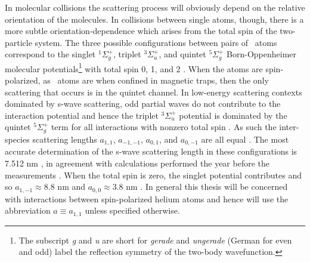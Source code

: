 	In molecular collisions the scattering process will obviously depend on the relative orientation of the molecules.
	In collisions between single atoms, though, there is a more subtle orientation-dependence which arises from the total spin of the two-particle system.
	The three possible configurations between pairs of \mhe~atoms correspond to the singlet $^1\Sigma_g^+$, triplet $^3\Sigma_u^+$, and quintet $^5\Sigma_g^+$ Born-Oppenheimer molecular potentials\footnote{The subscript \emph{g} and \emph{u} are short for \emph{gerade} and \emph{ungerade} (German for even and odd) label the reflection symmetry of the two-body wavefunction.} with total spin 0, 1, and 2 .
	When the atoms are spin-polarized, as \mhe~atoms are when confined in magnetic traps, then the only scattering that occurs is in the quintet channel.
	In low-energy scattering contexts dominated by s-wave scattering, odd partial waves do not contribute to the interaction potential and hence the triplet $^3\Sigma_u^+$ potential is dominated by the quintet $^5\Sigma_g^+$ term for all interactions with nonzero total spin \cite{Leo01}. 
	As such the inter-species scattering lengths $a_{1,1}$, $a_{-1,-1}$, $a_{0,1}$, and $a_{0,-1}$ are all equal \cite{Leo01,Vassen16}.
	The most accurate determination of the s-wave scattering length in these configurations is 7.512 nm \cite{Moal06}, in agreement with calculations performed the year before the measurements \cite{Przybytek05}.
	When the total spin is zero, the singlet potential contributes and so $a_{1,-1}\approx8.8$ nm and $a_{0,0}\approx3.8$ nm \cite{Leo01,Vassen16}.
	In general this thesis will be concerned with interactions between spin-polarized helium atoms and hence will use the abbreviation $a\equiv a_{1,1}$ unless specified otherwise.
	

